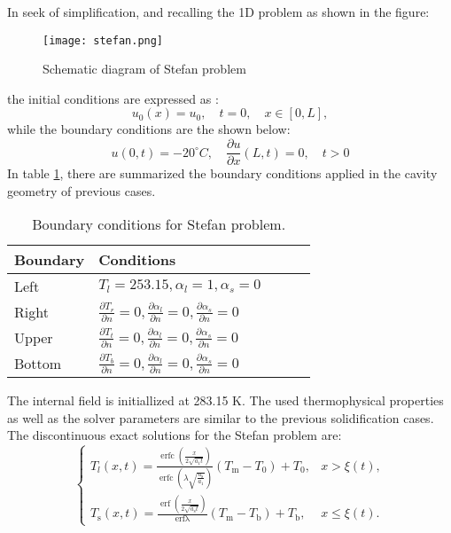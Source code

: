 \setlength{\parindent}{0.5cm} In seek of simplification, and recalling the 1D problem as shown in the figure:
\begin{figure}[h!]
	\centering
	\texttt{[image: stefan.png]}	
	\label{Stefanfig}
	\caption{Schematic diagram of Stefan problem}
\end{figure} 
\newline
the initial conditions are expressed as \cite{zhao_zhao_xu_2018}:
\begin{equation}
	u_{0}(x)=u_{0}, \quad t=0, \quad x \in[0, L],
	\label{3.45}
\end{equation}
while the boundary conditions are the shown below:
\begin{equation}
	u(0, t)=-20^{\circ}C, \quad \frac{\partial u}{\partial x}(L, t)=0, \quad t>0
	\label{3.46}
\end{equation}
\clearpage
\noindent In table \ref{3.19tab}, there are summarized the boundary conditions applied in the cavity geometry of previous cases.
\begin{table}[h!]
	\begin{tabular}{@{}lllll@{}}
		\toprule[1pt]
		\textbf{Boundary} & \textbf{Conditions}  \\ \midrule[2pt]
		Left & $ T_{l} = 253.15, \alpha_{l} = 1, \alpha_{s} = 0    $  \\
		Right & $\frac{\partial T_{r}}{\partial n} = 0,  \frac{\partial \alpha_{l}}{\partial n} = 0, \frac{\partial \alpha_{s}}{\partial n} = 0  $ \\
		Upper & $\frac{\partial T_{t}}{\partial n} = 0, \frac{\partial \alpha_{l}}{\partial n} = 0, \frac{\partial \alpha_{s}}{\partial n} = 0$  \\
		Bottom & $\frac{\partial T_{b}}{\partial n} = 0, \frac{\partial \alpha_{l}}{\partial n} = 0, \frac{\partial \alpha_{s}}{\partial n} = 0 $  \\ \bottomrule[1pt]		
	\end{tabular}
	\centering
	\caption{Boundary conditions for Stefan problem.}	
	\label{3.19tab}
\end{table}
\newline
\noindent The internal field is initiallized at 283.15 K. The used thermophysical properties as well as the solver parameters are similar to the previous solidification cases.
\newline
The discontinuous exact solutions for the Stefan problem are:
\begin{equation}
	\begin{cases}T_{l}(x, t)=\frac{\operatorname{erfc}\left(\frac{x}{2 \sqrt{a_{1} t}}\right)}{\operatorname{erfc}\left(\lambda \sqrt{\frac{a_{\mathrm{s}}}{a_{1}}}\right)}\left(T_{\mathrm{m}}-T_{0}\right)+T_{0}, & x>\xi(t), \\ 
	T_{\mathrm{s}}(x, t)=\frac{\operatorname{erf}\left(\frac{x}{2 \sqrt{a_{\mathrm{s}} t}}\right)}{\operatorname{erf \lambda }}\left(T_{\mathrm{m}}-T_{\mathrm{b}}\right)+T_{\mathrm{b}},& x \leq \xi(t)  .\end{cases}
	\label{3.47}
\end{equation}
